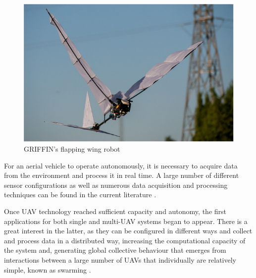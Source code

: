 \begin{figure}[htbp]
    \centering
    \includegraphics[width=0.6\linewidth]
    {Preliminaries/figures/GRIFFIN.png}
    \caption{GRIFFIN's flapping wing robot \cite{GRIFFIN2021}}
    \label{fig:griffin}
\end{figure}

For an aerial vehicle to operate autonomously, it is necessary to acquire data from the environment and process it in real time. A large number of different sensor configurations as well as numerous data acquisition and processing techniques can be found in the current literature \cite{SenseAndAvoid, aasen2018quantitative, miningSensors}.

Once UAV technology reached sufficient capacity and autonomy, the first applications for both single \cite{nex2014uav, radoglou2020compilation, drummond2015uav} and multi-\gls{UAV} \cite{martinez2007multi, gu2018multiple, scherer2015autonomous} systems began to appear. There is a great interest in the latter, as they can be configured in different ways \cite{multiUAVclassification} and collect and process data in a distributed way, increasing the computational capacity of the system \cite{pascarella2015parallel, guo2021coded} and, generating global collective behaviour that emerges from interactions between a large number of \glspl{UAV} that individually are relatively simple, known as swarming \cite{zhou2020uav, campion2018uav, chen2020sidr}. 

